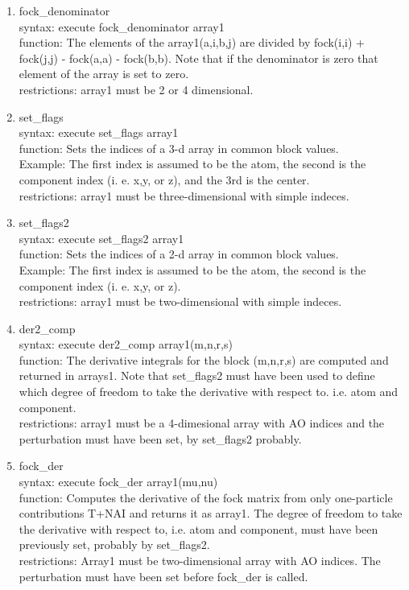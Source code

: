 \documentclass[12pt]{article}
\begin{document}
\begin{enumerate}
\item fock\_denominator\\ 
syntax: execute fock\_denominator array1\\ 
function: The elements of the array1(a,i,b,j) are divided by 
fock(i,i) + fock(j,j) - fock(a,a) - fock(b,b). Note that if the denominator is zero 
that element of the array is set to zero.\\ 
restrictions: array1 must be 2 or 4 dimensional.

\item set\_flags\\ 
syntax: execute set\_flags array1\\ 
function: Sets the indices of a 3-d array in common block values.\\
Example:
The first index is assumed to be the atom, the second is the component 
index (i. e. x,y, or z), and the 3rd is the center.\\ 
restrictions: array1 must be three-dimensional with simple indeces.

\item set\_flags2\\ 
syntax: execute set\_flags2 array1\\ 
function: Sets the indices of a 2-d array in common block values.\\
Example: The first index is assumed to be the atom, the second is the component 
index (i. e. x,y, or z).\\ 
restrictions: array1 must be two-dimensional with simple indeces.\\ 

\item der2\_comp\\ 
syntax: execute der2\_comp array1(m,n,r,s)\\ 
function: The derivative integrals for the block (m,n,r,s) are computed and returned in arrays1. 
Note that set\_flags2 must have been used to define which degree of freedom to take the 
derivative with respect to. i.e. atom and component.\\ 
restrictions: array1 must be a 4-dimesional array with AO indices and the perturbation must 
have been set, by set\_flags2 probably.\\ 

\item fock\_der\\ 
syntax: execute fock\_der array1(mu,nu)\\ 
function: Computes the derivative of the fock matrix from only one-particle 
contributions T+NAI and returns it as array1. The degree of freedom to take the derivative 
with respect to, i.e. atom and component, must have been previously set, probably by set\_flags2.\\
restrictions: Array1 must be two-dimensional array with AO indices. The perturbation must have 
been set before fock\_der is called.


\end{enumerate}
\end{document}

